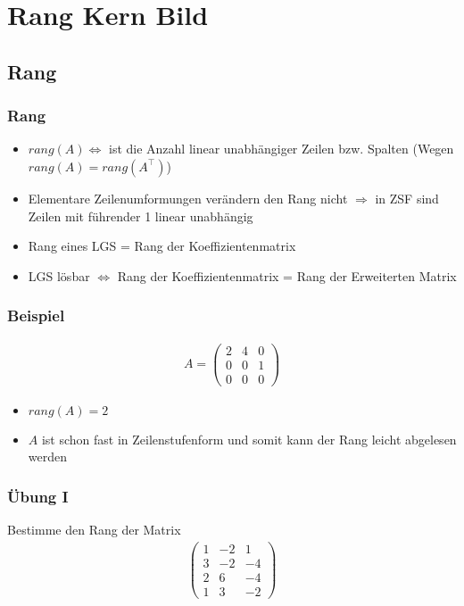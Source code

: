 \section{Rang Kern Bild}
\subsection{Rang}
\begin{frame}
    \frametitle{Rang}
    \begin{itemize}
        \item $rang(A) \Leftrightarrow$ ist die Anzahl linear unabhängiger Zeilen bzw. Spalten (Wegen $rang(A)=rang(A^\top)$)
        \item Elementare Zeilenumformungen verändern den Rang nicht $\Rightarrow$ in ZSF sind Zeilen mit führender 1 linear unabhängig
        \item Rang eines LGS = Rang der Koeffizientenmatrix
        \item LGS lösbar $\Leftrightarrow$ Rang der Koeffizientenmatrix = Rang der Erweiterten Matrix
    \end{itemize}
\end{frame}

\begin{frame}
	\frametitle{Beispiel}
	\begin{align*}
		A = \begin{pmatrix}
			2 & 4 & 0 \\
			0 & 0 & 1 \\
			0 & 0 & 0
		\end{pmatrix}
	\end{align*}
	\begin{itemize}
		\item $rang(A) = 2$
		\item $A$ ist schon fast in Zeilenstufenform und somit kann der Rang leicht abgelesen werden
	\end{itemize}
\end{frame}

\begin{frame}
	\frametitle{Übung I}
	Bestimme den Rang der Matrix
	\begin{align*}
		\begin{pmatrix}
			1 & -2 & 1 \\
			3 & -2 & -4 \\
			2 & 6 & -4 \\
			1 & 3 & -2 
		\end{pmatrix}
	\end{align*}
\end{frame}

